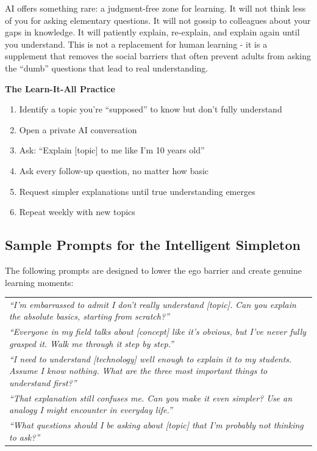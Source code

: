 \documentclass[
  letterpaper,
  DIV=11,
  numbers=noendperiod]{scrreprt}
\newcounter{none} %
\providecommand{\tightlist}{%
  \setlength{\itemsep}{0pt}\setlength{\parskip}{0pt}}
\begin{document}
AI offers something rare: a judgment-free zone for learning. It will not
think less of you for asking elementary questions. It will not gossip to
colleagues about your gaps in knowledge. It will patiently explain,
re-explain, and explain again until you understand. This is not a
replacement for human learning - it is a supplement that removes the
social barriers that often prevent adults from asking the ``dumb''
questions that lead to real understanding.

\textbf{The Learn-It-All Practice}

\begin{enumerate}
\def\labelenumi{\arabic{enumi}.}
\tightlist
\item
  Identify a topic you're ``supposed'' to know but don't fully
  understand
\item
  Open a private AI conversation
\item
  Ask: ``Explain {[}topic{]} to me like I'm 10 years old''
\item
  Ask every follow-up question, no matter how basic
\item
  Request simpler explanations until true understanding emerges
\item
  Repeat weekly with new topics
\end{enumerate}

\subsection{Sample Prompts for the Intelligent
Simpleton}\label{sample-prompts-for-the-intelligent-simpleton}

The following prompts are designed to lower the ego barrier and create
genuine learning moments:

{\def\LTcaptype{none} %
\begin{longtable}[]{@{}
  >{\raggedright\arraybackslash}p{}@{}}
\toprule\noalign{}
\endhead
\bottomrule\noalign{}
\endlastfoot
\emph{``I'm embarrassed to admit I don't really understand {[}topic{]}.
Can you explain the absolute basics, starting from scratch?''} \\
\emph{``Everyone in my field talks about {[}concept{]} like it's
obvious, but I've never fully grasped it. Walk me through it step by
step.''} \\
\emph{``I need to understand {[}technology{]} well enough to explain it
to my students. Assume I know nothing. What are the three most important
things to understand first?''} \\
\emph{``That explanation still confuses me. Can you make it even
simpler? Use an analogy I might encounter in everyday life.''} \\
\emph{``What questions should I be asking about {[}topic{]} that I'm
probably not thinking to ask?''} \\
\end{longtable}
}
\end{document}
